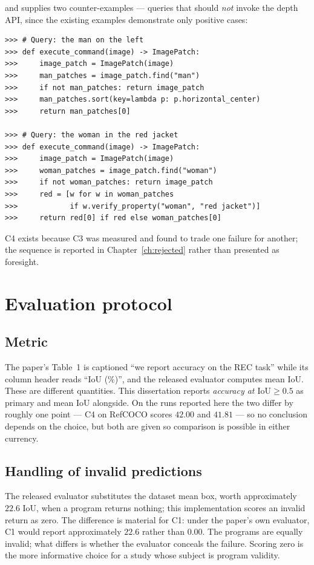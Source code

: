 \documentclass[12pt,a4paper,oneside]{report}
\begin{document}
and supplies two counter-examples --- queries that should \emph{not} invoke the depth
API, since the existing examples demonstrate only positive cases:

\begin{lstlisting}
>>> # Query: the man on the left
>>> def execute_command(image) -> ImagePatch:
>>>     image_patch = ImagePatch(image)
>>>     man_patches = image_patch.find("man")
>>>     if not man_patches: return image_patch
>>>     man_patches.sort(key=lambda p: p.horizontal_center)
>>>     return man_patches[0]

>>> # Query: the woman in the red jacket
>>> def execute_command(image) -> ImagePatch:
>>>     image_patch = ImagePatch(image)
>>>     woman_patches = image_patch.find("woman")
>>>     if not woman_patches: return image_patch
>>>     red = [w for w in woman_patches
>>>            if w.verify_property("woman", "red jacket")]
>>>     return red[0] if red else woman_patches[0]
\end{lstlisting}

C4 exists because C3 was measured and found to trade one failure for another; the
sequence is reported in Chapter~\ref{ch:rejected} rather than presented as foresight.

\section{Evaluation protocol}

\subsection{Metric}

The paper's Table~1 is captioned ``we report accuracy on the REC task'' while its
column header reads ``IoU (\%)'', and the released evaluator computes mean IoU. These
are different quantities. This dissertation reports \emph{accuracy at
$\mathrm{IoU}\geq 0.5$} as primary and mean IoU alongside. On the runs reported here
the two differ by roughly one point --- C4 on RefCOCO scores $42.00$ and $41.81$ --- so
no conclusion depends on the choice, but both are given so comparison is possible in
either currency.

\subsection{Handling of invalid predictions}

The released evaluator substitutes the dataset mean box, worth approximately $22.6$
IoU, when a program returns nothing; this implementation scores an invalid return as
zero. The difference is material for C1: under the paper's own evaluator, C1 would
report approximately $22.6$ rather than $0.00$. The programs are equally invalid; what
differs is whether the evaluator conceals the failure. Scoring zero is the more
informative choice for a study whose subject is program validity.
\end{document}
